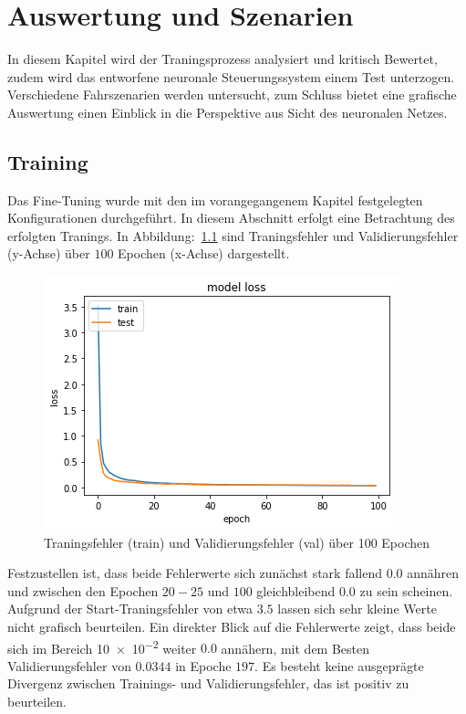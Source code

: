 %
\chapter{Auswertung und Szenarien}
In diesem Kapitel wird der Traningsprozess analysiert und kritisch Bewertet, zudem wird das entworfene neuronale Steuerungssystem einem Test unterzogen. Verschiedene Fahrszenarien werden untersucht, zum Schluss bietet eine grafische Auswertung einen Einblick in die Perspektive aus Sicht des neuronalen Netzes.

\section{Training}
Das Fine-Tuning wurde mit den im vorangegangenem Kapitel festgelegten Konfigurationen durchgeführt. In diesem Abschnitt erfolgt eine Betrachtung des erfolgten Tranings. In Abbildung:~\ref{img:loss} sind Traningsfehler und Validierungsfehler (y-Achse) über $100$ Epochen (x-Achse) dargestellt. 

\begin{figure}[h]
	\centering
	\includegraphics[scale=0.7]{figures/loss.png}
	\caption{Traningsfehler (train) und Validierungsfehler (val) über 100 Epochen}
	\label{img:loss}
\end{figure}

Festzustellen ist, dass beide Fehlerwerte sich zunächst stark fallend $0.0$ annähren und zwischen den Epochen $20-25$ und $100$ gleichbleibend $0.0$ zu sein scheinen. Aufgrund der Start-Traningsfehler von etwa $3.5$ lassen sich sehr kleine Werte nicht grafisch beurteilen. Ein direkter Blick auf die Fehlerwerte zeigt, dass beide sich im Bereich \num{10e-2} weiter $0.0$ annähern, mit dem Besten Validierungsfehler von $0.0344$ in Epoche $197$. Es besteht keine ausgeprägte Divergenz zwischen Trainings- und Validierungsfehler, das ist positiv zu beurteilen.

